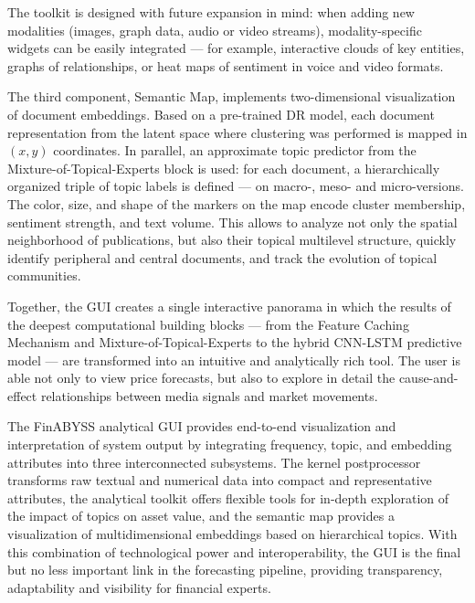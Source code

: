 The toolkit is designed with future expansion in mind: when adding new modalities (images, graph data, audio
or video streams), modality-specific widgets can be easily integrated — for example, interactive clouds of key
entities, graphs of relationships, or heat maps of sentiment in voice and video formats.

The third component, Semantic Map, implements two-dimensional visualization of document embeddings. Based
on a pre-trained DR model, each document representation from the latent space where
clustering was performed is mapped in $(x,y)$ coordinates. In parallel, an approximate topic predictor
from the Mixture-of-Topical-Experts block is used: for each document, a hierarchically organized triple
of topic labels is defined — on macro-, meso- and micro-versions. The color, size, and shape of the markers
on the map encode cluster membership, sentiment strength, and text volume. This allows to analyze not only
the spatial neighborhood of publications, but also their topical multilevel structure, quickly identify
peripheral and central documents, and track the evolution of topical communities.

Together, the GUI creates a single interactive panorama in which the results of the deepest computational
building blocks — from the Feature Caching Mechanism and Mixture-of-Topical-Experts to the hybrid CNN-LSTM
predictive model — are transformed into an intuitive and analytically rich tool. The user is able not only
to view price forecasts, but also to explore in detail the cause-and-effect relationships between media
signals and market movements.

The FinABYSS analytical GUI provides end-to-end visualization and interpretation of system output
by integrating frequency, topic, and embedding attributes into three interconnected subsystems. The kernel
postprocessor transforms raw textual and numerical data into compact and representative attributes,
the analytical toolkit offers flexible tools for in-depth exploration of the impact of topics on asset value,
and the semantic map provides a visualization of multidimensional embeddings based on hierarchical topics.
With this combination of technological power and interoperability, the GUI is the final but no less important
link in the forecasting pipeline, providing transparency, adaptability and visibility for financial experts.